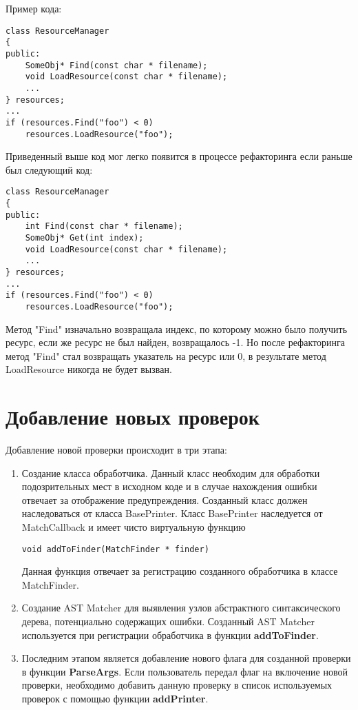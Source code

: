 Пример кода:
\begin{lstlisting}
class ResourceManager
{
public:
	SomeObj* Find(const char * filename);
	void LoadResource(const char * filename);
	...
} resources;
...
if (resources.Find("foo") < 0)
	resources.LoadResource("foo");
\end{lstlisting}
  
Приведенный выше код мог легко появится в процессе рефакторинга если раньше был следующий код: 
\begin{lstlisting}
class ResourceManager
{
public:
	int Find(const char * filename);
	SomeObj* Get(int index);
	void LoadResource(const char * filename);
	...
} resources;
...
if (resources.Find("foo") < 0)
	resources.LoadResource("foo");
\end{lstlisting}
Метод "Find" изначально возвращала индекс, по которому можно было получить ресурс, если же 
ресурс не был найден, возвращалось -1. Но после рефакторинга метод "Find" стал возвращать указатель на 
ресурс или 0, в результате метод LoadResource никогда не будет вызван.

\section{Добавление новых проверок}
\label{sec:addCheck}
Добавление новой проверки происходит в три этапа:
\begin{enumerate}
	\item Создание класса обработчика. Данный класс необходим для обработки подозрительных мест
в исходном коде и в случае нахождения ошибки отвечает за отображение предупреждения. Созданный класс
должен наследоваться от класса BasePrinter. Класс BasePrinter наследуется от MatchCallback и
имеет чисто виртуальную функцию
\begin{lstlisting}
void addToFinder(MatchFinder * finder)
\end{lstlisting} 
Данная функция отвечает за регистрацию созданного обработчика в классе MatchFinder.
	\item Создание AST Matcher для выявления узлов абстрактного синтаксического дерева, потенциально 
содержащих ошибки. Созданный AST Matcher используется при регистрации обработчика в функции 
\textbf{addToFinder}.
	\item Последним этапом является добавление нового флага для созданной проверки в функции 
\textbf{ParseArgs}. Если пользователь передал флаг на включение новой проверки, необходимо
добавить данную проверку в список используемых проверок с помощью функции \textbf{addPrinter}.
\end{enumerate}

